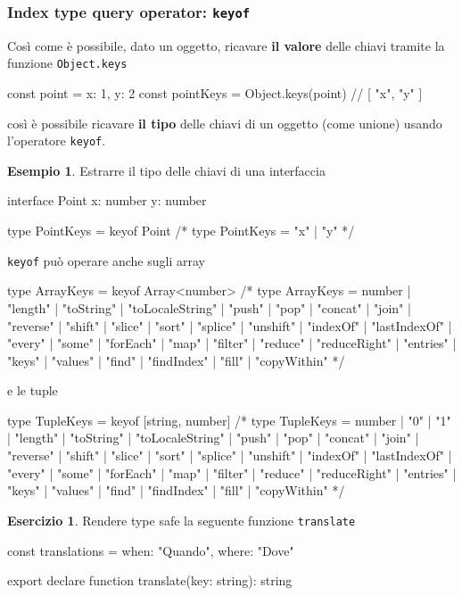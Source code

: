 \documentclass[12pt]{article}
\theoremstyle{definition}
\newtheorem{example}{Esempio}[subsection]
\newtheorem{exercise}{Esercizio}[subsection]
\newenvironment{code}
  {\vspace{0.5cm} \VerbatimEnvironment\begin{typescriptcode}}
  {\end{typescriptcode} \vspace{0.2cm}}
\begin{document}
\subsubsection{Index type query operator: \texttt{keyof}}

Così come è possibile, dato un oggetto, ricavare \textbf{il valore} delle chiavi tramite la funzione \texttt{Object.keys}

\begin{code}
const point = { x: 1, y: 2 }
const pointKeys = Object.keys(point)
// [ "x", "y" ]
\end{code}

così è possibile ricavare \textbf{il tipo} delle chiavi di un oggetto (come unione) usando l'operatore \texttt{keyof}.

\begin{example}
Estrarre il tipo delle chiavi di una interfaccia

\begin{code}
interface Point {
  x: number
  y: number
}

type PointKeys = keyof Point
/*
type PointKeys = "x" | "y"
*/
\end{code}

\texttt{keyof} può operare anche sugli array

\begin{code}
type ArrayKeys = keyof Array<number>
/*
type ArrayKeys = number | "length" | "toString" |
"toLocaleString" | "push" | "pop" | "concat" | "join" |
"reverse" | "shift" | "slice" | "sort" | "splice" |
"unshift" | "indexOf" | "lastIndexOf" | "every" | "some" |
"forEach" | "map" | "filter" | "reduce" | "reduceRight" |
"entries" | "keys" | "values" | "find" | "findIndex" |
"fill" | "copyWithin"
*/
\end{code}

e le tuple

\begin{code}
type TupleKeys = keyof [string, number]
/*
type TupleKeys = number | "0" | "1" | "length" | "toString" |
"toLocaleString" | "push" | "pop" | "concat" | "join" |
"reverse" | "shift" | "slice" | "sort" | "splice" |
"unshift" | "indexOf" | "lastIndexOf" | "every" |
"some" | "forEach" | "map" | "filter" | "reduce" |
"reduceRight" | "entries" | "keys" | "values" |
"find" | "findIndex" | "fill" | "copyWithin"
*/
\end{code}
\end{example}

\begin{exercise}
Rendere type safe la seguente funzione \texttt{translate}

\begin{code}
const translations = {
  when: "Quando",
  where: "Dove"
}

export declare function translate(key: string): string
\end{code}
\end{exercise}
\end{document}
